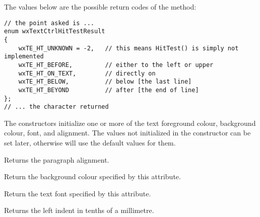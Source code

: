 The values below are the possible return codes of the 
 method:
{\small
\begin{verbatim}
// the point asked is ...
enum wxTextCtrlHitTestResult
{
    wxTE_HT_UNKNOWN = -2,   // this means HitTest() is simply not implemented
    wxTE_HT_BEFORE,         // either to the left or upper
    wxTE_HT_ON_TEXT,        // directly on
    wxTE_HT_BELOW,          // below [the last line]
    wxTE_HT_BEYOND          // after [the end of line]
};
// ... the character returned
\end{verbatim}
}




\label{wxtextattrctor}



The constructors initialize one or more of the text foreground colour, background
colour, font, and alignment. The values not initialized in the constructor can be set
later, otherwise  will use
the default values for them.


\label{wxtextattrgetalignment}


Returns the paragraph alignment.


\label{wxtextattrgetbackgroundcolour}


Return the background colour specified by this attribute.


\label{wxtextattrgetfont}


Return the text font specified by this attribute.


\label{wxtextattrgetleftindent}


Returns the left indent in tenths of a millimetre.


